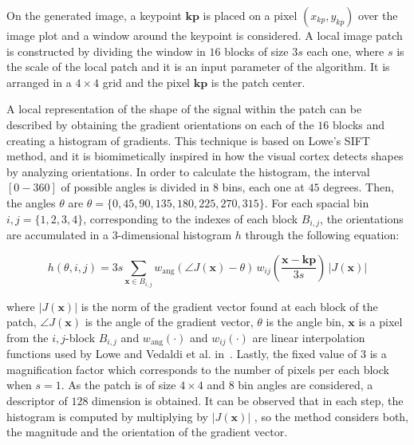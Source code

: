\documentclass[entropy,article,submit,moreauthors,pdftex,10pt,a4paper]{mdpi}
\begin{document}
On the generated image, a keypoint $\mathbf{kp}$ is placed on a pixel $(x_{kp}, y_{kp})$ over the image plot and a window around the keypoint is considered. A local image patch is constructed by dividing the window in $16$ blocks of size $3s$ each one,  where $s$ is the scale of the local patch and it is an input parameter of the algorithm. It is arranged in a $4 \times 4$ grid and the pixel $ \mathbf{kp}$ is the patch center. 

A local representation of the shape of the signal within the patch can be described by obtaining the gradient orientations on each of the $16$ blocks and creating a histogram of gradients.  This technique is based on Lowe's SIFT~\citep{Lowe2004} method, and it is biomimetically inspired in how the visual cortex detects shapes by analyzing orientations.   In order to calculate the histogram, the interval $[0-360]$ of possible angles is divided in $8$ bins, each one at $45$ degrees.
Then, the angles $\theta$  are $ \theta = \{0, 45, 90, 135, 180, 225, 270, 315\} $. For each spacial bin $ i,j = \{1,2,3,4\} $, corresponding to the indexes of each block $B_{i,j}$,  the orientations are accumulated in a  $3$-dimensional histogram $h$ through the following equation: %

\begin{equation}
 h(\theta,i,j) = 3s \sum_{\mathbf{x} \in B_{i,j}} w_\mathrm{ang}(\angle J(\mathbf{x}) - \theta)\, w_{ij}\left(\frac{\mathbf{x} - \mathbf{kp}}{3 s}\right)\, |J(\mathbf{x})|
\label{eq:histogram}
\end{equation}


\noindent  where $ |J(\mathbf{x})| $ is the norm of the gradient vector found at each block of the patch, $\angle J(\mathbf{x}) $ is the angle of the gradient vector,  $\theta$ is the angle bin, $\mathbf{x}$ is a pixel from  the $i,j$-block $B_{i,j}$ and $ w_\mathrm{ang}(\cdot) $  and $ w_{ij}(\cdot) $ are linear interpolation functions used by Lowe and Vedaldi et al. in~\citep{Lowe2004,Vedaldi2010}.  Lastly, the fixed value of $ 3 $ is a magnification factor which corresponds to the number of pixels per each block when $s = 1$.  As the patch is of size $4 \times 4$ and  $8$ bin angles are considered, a descriptor of $128$ dimension is obtained. It can be observed that in each step, the histogram is computed by multiplying by $ |J(\mathbf{x})| $ , so the method considers both, the magnitude and the orientation of the gradient vector. 
\end{document}
